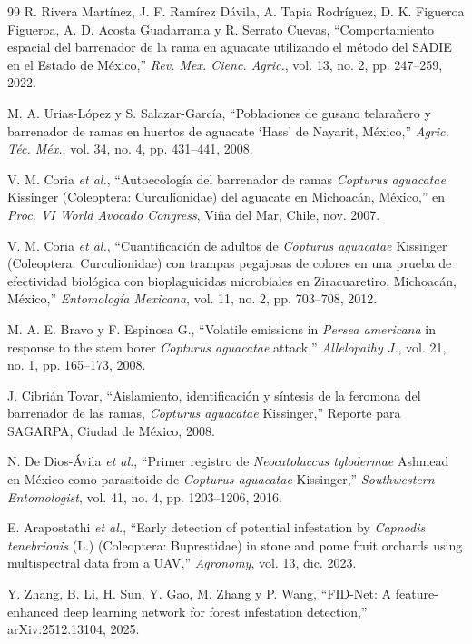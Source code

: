 \documentclass[conference]{IEEEtran}
\begin{document}
\begin{thebibliography}{99}
 R. Rivera Martínez, J. F. Ramírez Dávila, A. Tapia Rodríguez, D. K. Figueroa Figueroa, A. D. Acosta Guadarrama y R. Serrato Cuevas, ``Comportamiento espacial del barrenador de la rama en aguacate utilizando el método del SADIE en el Estado de México,'' \textit{Rev. Mex. Cienc. Agric.}, vol. 13, no. 2, pp. 247--259, 2022.

 M. A. Urias-López y S. Salazar-García, ``Poblaciones de gusano telarañero y barrenador de ramas en huertos de aguacate `Hass' de Nayarit, México,'' \textit{Agric. Téc. Méx.}, vol. 34, no. 4, pp. 431--441, 2008.

 V. M. Coria \textit{et al.}, ``Autoecología del barrenador de ramas \textit{Copturus aguacatae} Kissinger (Coleoptera: Curculionidae) del aguacate en Michoacán, México,'' en \textit{Proc. VI World Avocado Congress}, Viña del Mar, Chile, nov. 2007.

 V. M. Coria \textit{et al.}, ``Cuantificación de adultos de \textit{Copturus aguacatae} Kissinger (Coleoptera: Curculionidae) con trampas pegajosas de colores en una prueba de efectividad biológica con bioplaguicidas microbiales en Ziracuaretiro, Michoacán, México,'' \textit{Entomología Mexicana}, vol. 11, no. 2, pp. 703--708, 2012.

 M. A. E. Bravo y F. Espinosa G., ``Volatile emissions in \textit{Persea americana} in response to the stem borer \textit{Copturus aguacatae} attack,'' \textit{Allelopathy J.}, vol. 21, no. 1, pp. 165--173, 2008.

 J. Cibrián Tovar, ``Aislamiento, identificación y síntesis de la feromona del barrenador de las ramas, \textit{Copturus aguacatae} Kissinger,'' Reporte para SAGARPA, Ciudad de México, 2008.

 N. De Dios-Ávila \textit{et al.}, ``Primer registro de \textit{Neocatolaccus tylodermae} Ashmead en México como parasitoide de \textit{Copturus aguacatae} Kissinger,'' \textit{Southwestern Entomologist}, vol. 41, no. 4, pp. 1203--1206, 2016.

 E. Arapostathi \textit{et al.}, ``Early detection of potential infestation by \textit{Capnodis tenebrionis} (L.) (Coleoptera: Buprestidae) in stone and pome fruit orchards using multispectral data from a UAV,'' \textit{Agronomy}, vol. 13, dic. 2023.

 Y. Zhang, B. Li, H. Sun, Y. Gao, M. Zhang y P. Wang, ``FID-Net: A feature-enhanced deep learning network for forest infestation detection,'' arXiv:2512.13104, 2025.


\end{thebibliography}
\end{document}
